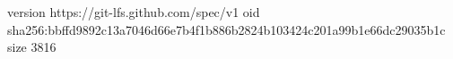 version https://git-lfs.github.com/spec/v1
oid sha256:bbffd9892c13a7046d66e7b4f1b886b2824b103424c201a99b1e66dc29035b1c
size 3816
